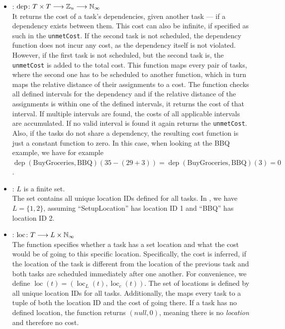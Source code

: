 \begin{itemize}
      \item {}: $\operatorname{dep} \colon T \times T \longrightarrow \mathbb{Z}_u \longrightarrow \mathbb{N}_{\infty}$ \\
            It returns the cost of a task's dependencies, given another task --- if a dependency exists between them. This cost can also be infinite, if specified as such in the \texttt{unmetCost}. If the second task is not scheduled, the dependency function does not incur any cost, as the dependency itself is not violated. However, if the first task is not scheduled, but the second task is, the \texttt{unmetCost} is added to the total cost. This function maps every pair of tasks, where the second one has to be scheduled to another function, which in turn maps the relative distance of their assignments to a cost. The function checks all defined intervals for the dependency and if the relative distance of the assignments is within one of the defined intervals, it returns the cost of that interval. If multiple intervals are found, the costs of all applicable intervals are accumulated. If no valid interval is found it again returns the \texttt{unmetCost}. Also, if the tasks do not share a dependency, the resulting cost function is just a constant function to zero. In this case, when looking at the \ac{BBQ} example, we have for example $\operatorname{dep}(\text{BuyGroceries}, \text{BBQ})(35 - (29 + 3)) = \operatorname{dep}(\text{BuyGroceries}, \text{BBQ})(3) = 0$.

      \item {}: $L$ is a finite set. \\
            The set contains all unique location IDs defined for all tasks. In , we have $L = \{ 1, 2 \}$, assuming ``SetupLocation'' has location ID 1 and ``BBQ'' has location ID 2.

      \item {}: $\operatorname{loc} \colon T \longrightarrow L \times \mathbb{N}_{\infty}$ \\
            The function specifies whether a task has a set location and what the cost would be of going to this specific location. Specifically, the cost is inferred, if the location of the task is different from the location of the previous task and both tasks are scheduled immediately after one another. For convenience, we define $\operatorname{loc}(t) = (\operatorname{loc}_L(t), \operatorname{loc}_c(t))$. The set of locations is defined by all unique location IDs for all tasks. Additionally, the  maps every task to a tuple of both the location ID and the cost of going there. If a task has no defined location, the function returns $(null, 0)$, meaning there is no \emph{location} and therefore no cost.
\end{itemize}
